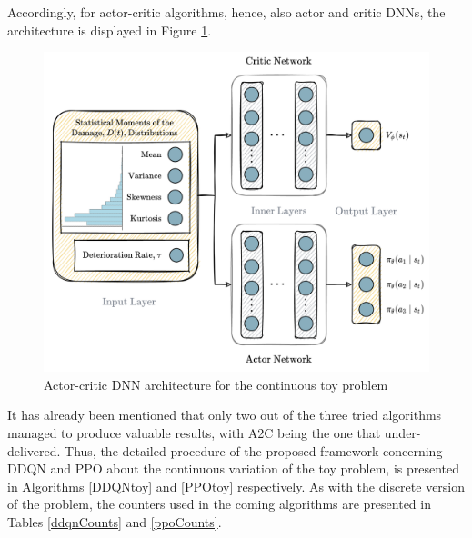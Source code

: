 Accordingly, for actor-critic algorithms, hence, also actor and critic \glspl{DNN}, the architecture is displayed in Figure \ref{dnnToyContPPO}.

\begin{figure}[H]
    \centering
	\includegraphics[width=0.9\linewidth]{Figures/dnnToyContPPO.png}
	\caption{Actor-critic \gls{DNN} architecture for the continuous toy problem}
	\label{dnnToyContPPO}
\end{figure}

It has already been mentioned that only two out of the three tried algorithms managed to produce valuable results, with \gls{A2C} being the one that under-delivered. Thus, the detailed procedure of the proposed framework concerning \gls{DDQN} and \gls{PPO} about the continuous variation of the toy problem, is presented in Algorithms \ref{DDQNtoy} and \ref{PPOtoy} respectively. As with the discrete version of the problem, the counters used in the coming algorithms are presented in Tables \ref{ddqnCounts} and \ref{ppoCounts}.\\




